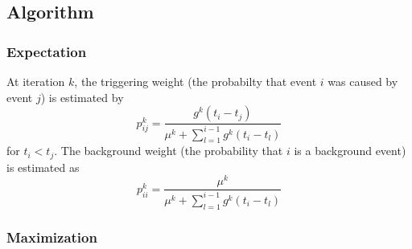 \documentclass[a4paper]{article}
\begin{document}

\subsection{Algorithm} %
\label{sub:algorithm}

\subsubsection{Expectation} %
\label{ssub:expectation}

At iteration $k$,
the triggering weight (the probabilty that event $i$ was caused by event $j$) is estimated by
\begin{equation}
	\label{eq:expectation_triggering}
	p_{ij}^k = \frac{g^k(t_i - t_j)}{\mu^k + \sum_{l=1}^{i-1} g^k(t_i - t_l)}
\end{equation}
for $t_i < t_j$. The background weight (the probability that $i$ is a background event) is estimated as
\begin{equation}
	\label{eq:expectation_background}
	p_{ii}^k = \frac{\mu^k}{\mu^k + \sum_{l=1}^{i-1} g^k(t_i - t_l)}
\end{equation}


\subsubsection{Maximization} %
\label{ssub:maximization}
\end{document}
